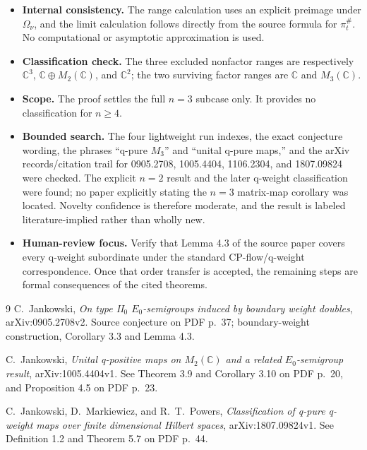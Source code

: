 \documentclass[11pt]{article}
\newcommand{\C}{\mathbb C}
\begin{document}
\begin{itemize}[leftmargin=1.5em]
  \item \textbf{Internal consistency.} The range calculation uses an explicit
  preimage under $\Omega_\nu$, and the limit calculation follows directly
  from the source formula for $\pi_t^\#$. No computational or asymptotic
  approximation is used.
  \item \textbf{Classification check.} The three excluded nonfactor ranges
  are respectively $\C^3$, $\C\oplus M_2(\C)$, and $\C^2$; the two surviving
  factor ranges are $\C$ and $M_3(\C)$.
  \item \textbf{Scope.} The proof settles the full $n=3$ subcase only. It
  provides no classification for $n\geq4$.
  \item \textbf{Bounded search.} The four lightweight run indexes, the exact
  conjecture wording, the phrases ``q-pure $M_3$'' and ``unital q-pure maps,''
  and the arXiv records/citation trail for 0905.2708, 1005.4404, 1106.2304,
  and 1807.09824 were checked. The explicit $n=2$ result and the later q-weight
  classification were found; no paper explicitly stating the $n=3$ matrix-map
  corollary was located. Novelty confidence is therefore moderate, and the
  result is labeled literature-implied rather than wholly new.
  \item \textbf{Human-review focus.} Verify that Lemma 4.3 of the source paper
  covers every q-weight subordinate under the standard CP-flow/q-weight
  correspondence. Once that order transfer is accepted, the remaining steps
  are formal consequences of the cited theorems.
\end{itemize}

\begin{thebibliography}{9}
C.~Jankowski,
\emph{On type II$_0$ $E_0$-semigroups induced by boundary weight doubles},
arXiv:0905.2708v2. Source conjecture on PDF p.~37; boundary-weight construction,
Corollary 3.3 and Lemma 4.3.

C.~Jankowski,
\emph{Unital q-positive maps on $M_2(\C)$ and a related $E_0$-semigroup result},
arXiv:1005.4404v1. See Theorem 3.9 and Corollary 3.10 on PDF p.~20,
and Proposition 4.5 on PDF p.~23.

C.~Jankowski, D.~Markiewicz, and R.~T.~Powers,
\emph{Classification of q-pure q-weight maps over finite dimensional Hilbert spaces},
arXiv:1807.09824v1. See Definition 1.2 and Theorem 5.7 on PDF p.~44.
\end{thebibliography}
\end{document}
